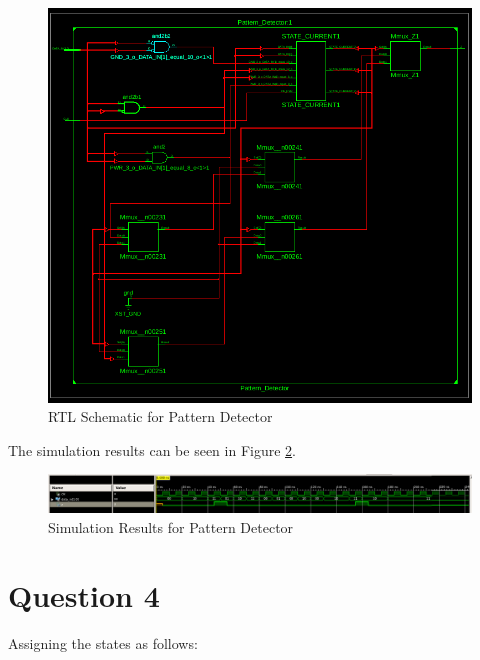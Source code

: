 \documentclass[table ]{article}
\begin{document}
\begin{figure}[H]
    \centering
    \includegraphics[width=\textwidth]{img/3/rtl.png}
    \caption{RTL Schematic for Pattern Detector}
    \label{fig:pattern_detector_rtl}

\end{figure}

The simulation results can be seen in Figure \ref{fig:pattern_detector_sim}.

\begin{figure}[H]
    \centering
    \includegraphics[width=\textwidth]{img/3/sim.png}
    \caption{Simulation Results for Pattern Detector}
    \label{fig:pattern_detector_sim}
\end{figure}



\section*{Question 4}

Assigning the states as follows:
\end{document}
